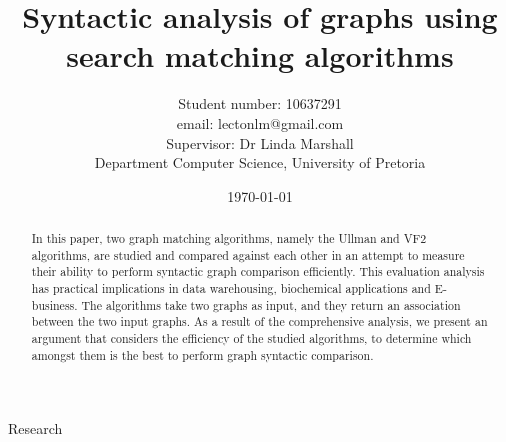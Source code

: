 \documentclass[titlepage]{article}
\title{Syntactic analysis of graphs using search matching algorithms}
\author{Student number:  10637291\\
		email:  lectonlm@gmail.com\\
		Supervisor: Dr  Linda Marshall\\
		Department Computer Science, University of Pretoria}
\date{\today}
\begin{document}
\maketitle

\begin{abstract}
In this paper, two graph matching algorithms, namely the Ullman and VF2 algorithms, are studied and compared against each other in an attempt to measure their ability to perform syntactic graph comparison efficiently. This
evaluation analysis has practical implications in data warehousing, biochemical applications and E-business. The algorithms take two graphs as input, and they return an association between the two
input graphs. As a result of the comprehensive analysis, we present an argument that considers
the efficiency of the studied algorithms, to determine which amongst them is the best to 
perform graph syntactic comparison.
\end{abstract}
\tableofcontents
\newpage

{Research}
\end{document}
